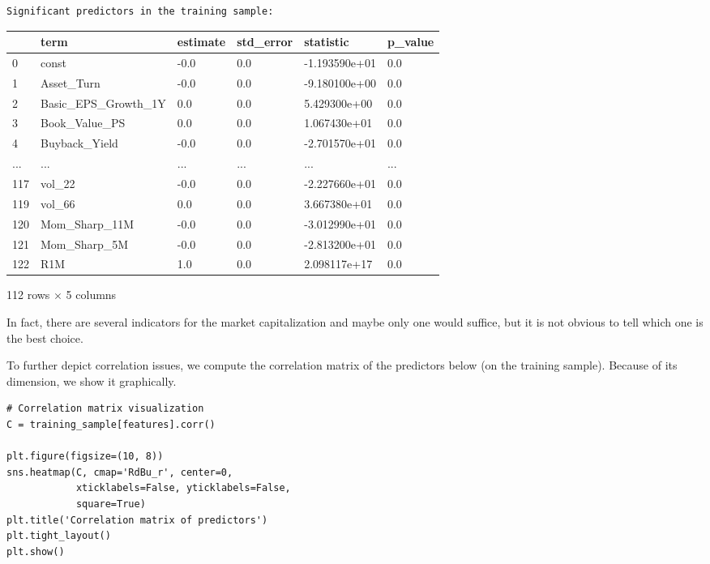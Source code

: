 \begin{verbatim}
Significant predictors in the training sample:
\end{verbatim}

\bigskip\noindent
\begin{tabular}{p{}p{}p{}p{}p{}p{}}
\toprule
 & term & estimate & std\_error & statistic & p\_value \\
\hline
0 & const & -0.0 & 0.0 & -1.193590e+01 & 0.0 \\
\hline
1 & Asset\_Turn & -0.0 & 0.0 & -9.180100e+00 & 0.0 \\
\hline
2 & Basic\_EPS\_Growth\_1Y & 0.0 & 0.0 & 5.429300e+00 & 0.0 \\
\hline
3 & Book\_Value\_PS & 0.0 & 0.0 & 1.067430e+01 & 0.0 \\
\hline
4 & Buyback\_Yield & -0.0 & 0.0 & -2.701570e+01 & 0.0 \\
\hline
... & ... & ... & ... & ... & ... \\
\hline
117 & vol\_22 & -0.0 & 0.0 & -2.227660e+01 & 0.0 \\
\hline
119 & vol\_66 & 0.0 & 0.0 & 3.667380e+01 & 0.0 \\
\hline
120 & Mom\_Sharp\_11M & -0.0 & 0.0 & -3.012990e+01 & 0.0 \\
\hline
121 & Mom\_Sharp\_5M & -0.0 & 0.0 & -2.813200e+01 & 0.0 \\
\hline
122 & R1M & 1.0 & 0.0 & 2.098117e+17 & 0.0 \\
\hline
\bottomrule
\end{tabular}

\bigskip

112 rows $\times$ 5 columns

In fact, there are several indicators for the market capitalization and maybe only one would suffice, but it is not obvious to tell which one is the best choice.

To further depict correlation issues, we compute the correlation matrix of the predictors below (on the training sample). Because of its dimension, we show it graphically.

\begin{verbatim}
# Correlation matrix visualization
C = training_sample[features].corr()

plt.figure(figsize=(10, 8))
sns.heatmap(C, cmap='RdBu_r', center=0, 
            xticklabels=False, yticklabels=False,
            square=True)
plt.title('Correlation matrix of predictors')
plt.tight_layout()
plt.show()
\end{verbatim}

